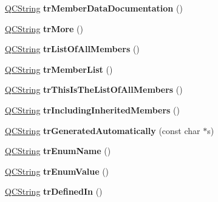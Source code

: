 \begin{DoxyCompactItemize}
\mbox{\hyperlink{class_q_c_string}{Q\+C\+String}} {\bfseries tr\+Member\+Data\+Documentation} ()
\item 
\mbox{\label{class_translator_slovene_a9387f6c7ee3a4980de8db7fc99b3dc89}} 
\mbox{\hyperlink{class_q_c_string}{Q\+C\+String}} {\bfseries tr\+More} ()
\item 
\mbox{\label{class_translator_slovene_aca1ad0f3927f4e05992cfdbe4ea5a36b}} 
\mbox{\hyperlink{class_q_c_string}{Q\+C\+String}} {\bfseries tr\+List\+Of\+All\+Members} ()
\item 
\mbox{\label{class_translator_slovene_a0c28bdd82a363bae1ea57736e2571001}} 
\mbox{\hyperlink{class_q_c_string}{Q\+C\+String}} {\bfseries tr\+Member\+List} ()
\item 
\mbox{\label{class_translator_slovene_a26e85979ae53ec2fe6d9adff884c086b}} 
\mbox{\hyperlink{class_q_c_string}{Q\+C\+String}} {\bfseries tr\+This\+Is\+The\+List\+Of\+All\+Members} ()
\item 
\mbox{\label{class_translator_slovene_a73cb9444d59d7bda6abf68bb7b8ef893}} 
\mbox{\hyperlink{class_q_c_string}{Q\+C\+String}} {\bfseries tr\+Including\+Inherited\+Members} ()
\item 
\mbox{\label{class_translator_slovene_af48fc45729d1dd01f8210b560d6be897}} 
\mbox{\hyperlink{class_q_c_string}{Q\+C\+String}} {\bfseries tr\+Generated\+Automatically} (const char $\ast$s)
\item 
\mbox{\label{class_translator_slovene_a45866cef738f83d23caf42abc7d5238d}} 
\mbox{\hyperlink{class_q_c_string}{Q\+C\+String}} {\bfseries tr\+Enum\+Name} ()
\item 
\mbox{\label{class_translator_slovene_a95fc785df160a252946abd72c08137e7}} 
\mbox{\hyperlink{class_q_c_string}{Q\+C\+String}} {\bfseries tr\+Enum\+Value} ()
\item 
\mbox{\label{class_translator_slovene_af7fa5a19034b4808a606e92ceef50f58}} 
\mbox{\hyperlink{class_q_c_string}{Q\+C\+String}} {\bfseries tr\+Defined\+In} ()

\end{DoxyCompactItemize}
